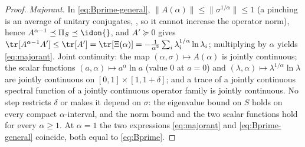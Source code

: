 \begin{proof}
\emph{Majorant.} In \eqref{eq:Bprime-general},
$\|A(\alpha)\|\le\|\sigma^{1/\alpha}\|\le1$ (a pinching is an average of
unitary conjugates, , so it cannot increase
the operator norm), hence
$A^{\alpha-1}\preceq\Pi_S\preceq\idon{}$, and $A'\succeq0$ gives
$\tr[A^{\alpha-1}A']\le\tr[A']=\tr[\Xi(\alpha)]
=-\frac1{\alpha^{2}}\sum_i\lambda_i^{1/\alpha}\ln\lambda_i$; multiplying
by $\alpha$ yields \eqref{eq:majorant}. Joint continuity: the map
$(\alpha,\sigma)\mapsto A(\alpha)$ is jointly continuous; the scalar
functions $(a,\alpha)\mapsto a^{\alpha}\ln a$ (value $0$ at $a=0$) and
$(\lambda,\alpha)\mapsto\lambda^{1/\alpha}\ln\lambda$ are jointly
continuous on $[0,1]\times[1,1+\delta]$; and a trace of a jointly
continuous spectral function of a jointly continuous operator family is
jointly continuous. No step restricts $\delta$ or makes it depend on
$\sigma$: the eigenvalue bound on $S$ holds on every compact
$\alpha$-interval, and the norm bound and the two scalar functions hold for
every $\alpha\ge1$. At $\alpha=1$ the two expressions
\eqref{eq:majorant} and \eqref{eq:Bprime-general} coincide, both equal to
\eqref{eq:Bprime}.
\end{proof}
